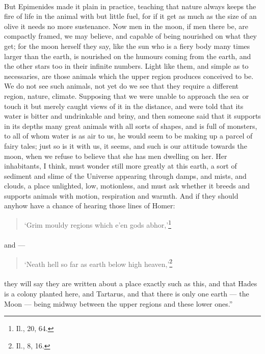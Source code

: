 \documentclass[a4paper, 11pt, oneside, polutonikogreek, english]{article}
\begin{document}
\paragraph{}
But Epimenides made it plain in practice, teaching that nature always keeps the fire of life in the animal with but little fuel, for if it get as much as the size of an olive it needs no more sustenance. Now men in the moon, if men there be, are compactly framed, we may believe, and capable of being nourished on what they get; for the moon herself they say, like the sun who is a fiery body many times larger than the earth, is nourished on the humours coming from the earth, and the other stars too in their infinite numbers. Light like them, and simple as to necessaries, are those animals which the upper region produces conceived to be. We do not see such animals, not yet do we see that they require a different region, nature, climate. Supposing that we were unable to approach the sea or touch it but merely caught views of it in the distance, and were told that its water is bitter and undrinkable and briny, and then someone said that it supports in its depths many great animals with all sorts of shapes, and is full of monsters, to all of whom water is as air to us, he would seem to be making up a parcel of fairy tales; just so is it with us, it seems, and such is our attitude towards the moon, when we refuse to believe that she has men dwelling on her. Her inhabitants, I think, must wonder still more greatly at this earth, a sort of sediment and slime of the Universe appearing through damps, and mists, and clouds, a place unlighted, low, motionless, and must ask whether it breeds and supports animals with motion, respiration and warmth. And if they should anyhow have a chance of hearing those lines of Homer:
\begin{quotation}
`Grim mouldy regions which e'en gods abhor,'\footnote{Il., 20, 64.}
\end{quotation}
\paragraph{}
and ---
\begin{quotation}
`Neath hell so far as earth below high heaven,'\footnote{Il., 8, 16.}
\end{quotation}
\paragraph{}
they will say they are written about a place exactly such as this, and that Hades is a colony planted here, and Tartarus, and that there is only one earth --- the Moon --- being midway between the upper regions and these lower ones.''
\end{document}
